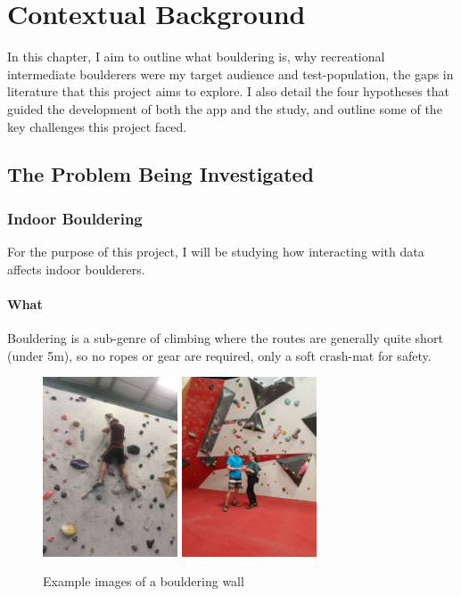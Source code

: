 \chapter{Contextual Background}
\label{chap:context}

%

In this chapter, I aim to outline what bouldering is, why recreational intermediate boulderers were my target audience and test-population, the gaps in literature that this project aims to explore.
I also detail the four hypotheses that guided the development of both the app and the study, and outline some of the key challenges this project faced.

\section{The Problem Being Investigated}
\subsection{Indoor Bouldering}
For the purpose of this project, I will be studying how interacting with data affects indoor boulderers.

\subsubsection{What}
Bouldering is a sub-genre of climbing where the routes are generally quite short (under 5m), so no ropes or gear are required, only a soft crash-mat for safety.
\begin{figure}[h]
\centering
\includegraphics[width=4cm]{imgs/boulder}
\includegraphics[width=4cm]{imgs/wall}
\caption{Example images of a bouldering wall}
\label{fig:playstore}
\end{figure}

